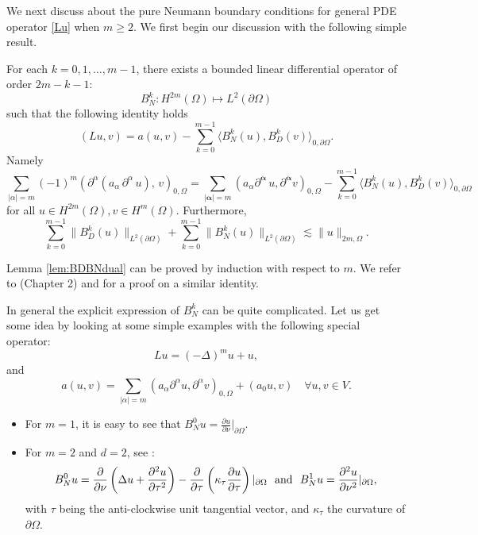 We next discuss about the pure Neumann boundary conditions 
for general PDE operator \eqref{Lu} when $m\ge 2$.  We first begin our discussion
with the following simple result. 
\begin{lemma} \label{lem:BDBNdual}
For each $k=0,1,\ldots,m-1$, there exists a bounded linear differential operator of order $2m-k-1$:
\begin{equation}
    \label{BN}
B_N^k: H^{2m}(\Omega)\mapsto L^2(\partial\Omega)    
  \end{equation}
such that the following identity holds
$$
(Lu,v)=a(u,v)-\sum_{k=0}^{m-1}\langle B_N^k(u),B_D^k(v)\rangle _{0,\partial\Omega}.
$$
Namely
\begin{equation}
\label{BDBNdual}
\sum_{|\alpha|=m}(-1)^m\left(\partial^\alpha
  (a_\alpha\,\partial^\alpha\,u),\,v\right) _{0,\Omega}
=\sum_{|{\boldsymbol{\alpha}}|=m}\left(a_\alpha\partial^{\boldsymbol{\alpha}}\,u, \partial^{\boldsymbol{\alpha}} v\right) _{0,\Omega}
-\sum_{k=0}^{m-1}\langle B_N^k(u),B_D^k(v)\rangle _{0,\partial\Omega}
\end{equation}
for all $u\in H^{2m}(\Omega), v\in  H^{m}(\Omega)$. Furthermore, 
\begin{equation}\label{equ:regassum}
\sum_{k=0}^{m-1}\|B_D^k(u)\|_{L^2(\partial\Omega)}+\sum_{k=0}^{m-1}\|B_N^k(u)\|_{L^2(\partial\Omega)}\lesssim \|u\|_{2m, \Omega}.
\end{equation}
\end{lemma}
Lemma \ref{lem:BDBNdual} can be proved by induction with
respect to $m$.  We refer to \cite{lions2012non} (Chapter 2) and \cite{chen2020nonconforming} for a proof on a similar identity.

In general the explicit expression of $B_N^k$ can be quite
complicated.  Let us get some idea by looking at some simple examples
with the following special operator:
\begin{equation}
  \label{Delta-m}
Lu=(-\Delta)^m u+u,
\end{equation}
and 
\begin{equation}
a(u,v)= \sum_{|\alpha | = m}(a_\alpha\partial^{\alpha}u, \partial^{\alpha}v)_{0,\Omega} +(a_0u,v)\quad \forall
u, v \in V.
\end{equation}

\begin{itemize}
\item For $m=1$, it is easy to see that $B_N^0 u=\frac{\partial u}{\partial
    \nu}|_{\partial\Omega}$.
\item For $m=2$ and $d=2$, see \cite{chien1980variational}: 
$$
B_N^0 u= \frac{\partial}{\partial \nu}\left(\Delta
  u+\frac{\partial^2u}{\partial
    \tau^2}\right)-\frac{\partial}{\partial
  \tau}\left({\kappa_\tau}\frac{\partial u}{\partial \tau}\right)|_{\partial\Omega}~~\hbox{and}~~B_N^1 u=\frac{\partial^2u}{\partial \nu^2}|_{\partial\Omega},
$$
   with $\tau$ being the
anti-clockwise unit tangential vector, and $\kappa_\tau$ the curvature
of $\partial\Omega$. 
\end{itemize} 

